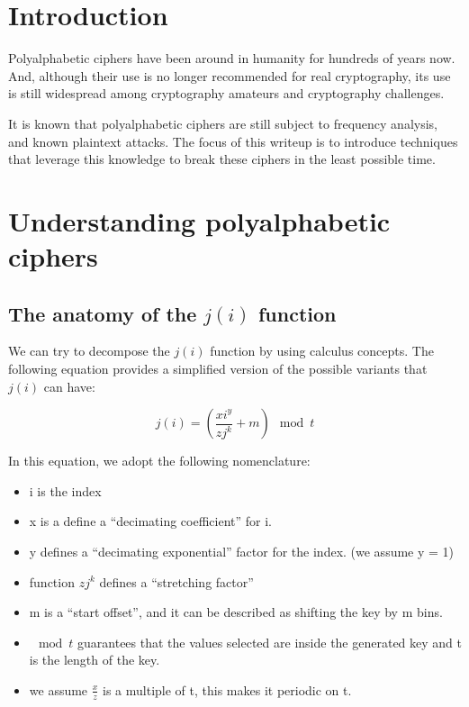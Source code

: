 \documentclass[pdftex,12pt,letter]{article}
\begin{document}

\newpage
\tableofcontents
\newpage

\section{Introduction}
Polyalphabetic ciphers have been around in humanity for hundreds of years now.
And, although their use is no longer recommended for real cryptography, its use
is still widespread among cryptography amateurs and cryptography
challenges.

It is known that polyalphabetic ciphers are still subject to frequency
analysis, and known plaintext attacks. The focus of this writeup is to
introduce techniques that leverage this knowledge to break these ciphers in the
least possible time.

\section{Understanding polyalphabetic ciphers}


\subsection{The anatomy of the $j(i)$ function}

We can try to decompose the $j(i)$ function by using calculus concepts. The
following equation provides a simplified version of the possible variants that
$j(i)$ can have:

\begin{equation}
    j(i) = \left( \frac{xi^y}{zj^k} + m \right) \mod{t}
\end{equation}

In this equation, we adopt the following nomenclature:
\begin{itemize}
    \item i is the index
    \item x is a define a ``decimating coefficient'' for i.
    \item y defines a ``decimating exponential'' factor for the index. (we assume y = 1)
    \item function $zj^k$ defines a ``stretching factor''
    \item m is a ``start offset'', and it can be described as shifting the key by m bins.
    \item $\mod{t}$ guarantees that the values selected are inside the generated key and t is the length of the key.
    \item we assume $\frac{x}{z}$ is a multiple of t, this makes it periodic on t.
\end{itemize}
\end{document}
